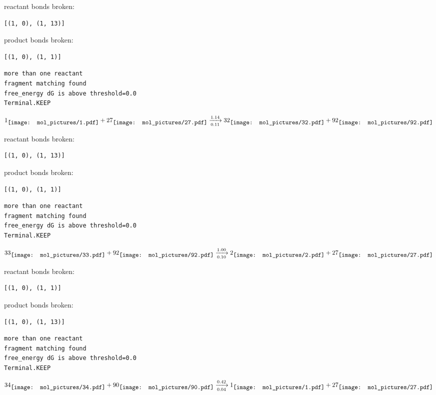 \documentclass{article}
\begin{document}
reactant bonds broken:\begin{verbatim}
[(1, 0), (1, 13)]
\end{verbatim}
product bonds broken:\begin{verbatim}
[(1, 0), (1, 1)]
\end{verbatim}




\vspace{1cm}
\begin{verbatim}
more than one reactant
fragment matching found
free_energy dG is above threshold=0.0
Terminal.KEEP
\end{verbatim}
$$
1
\raisebox{-.5\height}{\texttt{[image: mol\_pictures/1.pdf]}}
+
27
\raisebox{-.5\height}{\texttt{[image: mol\_pictures/27.pdf]}}
\xrightarrow[0.11]{1.14}
32
\raisebox{-.5\height}{\texttt{[image: mol\_pictures/32.pdf]}}
+
92
\raisebox{-.5\height}{\texttt{[image: mol\_pictures/92.pdf]}}
$$


reactant bonds broken:\begin{verbatim}
[(1, 0), (1, 13)]
\end{verbatim}
product bonds broken:\begin{verbatim}
[(1, 0), (1, 1)]
\end{verbatim}




\vspace{1cm}
\begin{verbatim}
more than one reactant
fragment matching found
free_energy dG is above threshold=0.0
Terminal.KEEP
\end{verbatim}
$$
33
\raisebox{-.5\height}{\texttt{[image: mol\_pictures/33.pdf]}}
+
92
\raisebox{-.5\height}{\texttt{[image: mol\_pictures/92.pdf]}}
\xrightarrow[0.10]{1.00}
2
\raisebox{-.5\height}{\texttt{[image: mol\_pictures/2.pdf]}}
+
27
\raisebox{-.5\height}{\texttt{[image: mol\_pictures/27.pdf]}}
$$


reactant bonds broken:\begin{verbatim}
[(1, 0), (1, 1)]
\end{verbatim}
product bonds broken:\begin{verbatim}
[(1, 0), (1, 13)]
\end{verbatim}




\vspace{1cm}
\begin{verbatim}
more than one reactant
fragment matching found
free_energy dG is above threshold=0.0
Terminal.KEEP
\end{verbatim}
$$
34
\raisebox{-.5\height}{\texttt{[image: mol\_pictures/34.pdf]}}
+
90
\raisebox{-.5\height}{\texttt{[image: mol\_pictures/90.pdf]}}
\xrightarrow[0.04]{0.42}
1
\raisebox{-.5\height}{\texttt{[image: mol\_pictures/1.pdf]}}
+
27
\raisebox{-.5\height}{\texttt{[image: mol\_pictures/27.pdf]}}
$$
\end{document}

